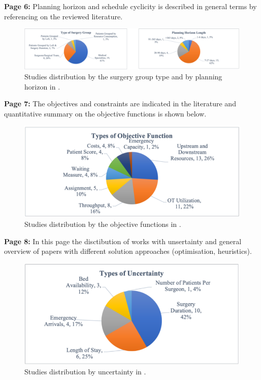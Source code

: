     \textbf{Page 6:}
    Planning horizon and schedule cyclicity is described in general terms by referencing on the reviewed literature.
    \begin{figure}[H]
        \centering
        \includegraphics[width=.8\textwidth]{figures/0007_SR01MY22/fig3.png}
        \caption{Studies distribution by the surgery group type and by planning horizon in \cite{x236}.}
        \label{fig3:0007_SR01MY22}
    \end{figure}

    \textbf{Page 7:}
    The objectives and constraints are indicated in the literature and quantitative summary on the objective functions is shown below.
    \begin{figure}[H]
        \centering
        \includegraphics[width=.8\textwidth]{figures/0007_SR01MY22/fig4.png}
        \caption{Studies distribution by the objective functions in \cite{x236}.}
        \label{fig4:0007_SR01MY22}
    \end{figure}

    \textbf{Page 8:}
    In this page the disctibution of works with unsertainty and general overview of papers with different solution approaches (optimisation, heuristics).
    \begin{figure}[H]
        \centering
        \includegraphics[width=.8\textwidth]{figures/0007_SR01MY22/fig5.png}
        \caption{Studies distribution by uncertainty in \cite{x236}.}
        \label{fig5:0007_SR01MY22}
    \end{figure}

